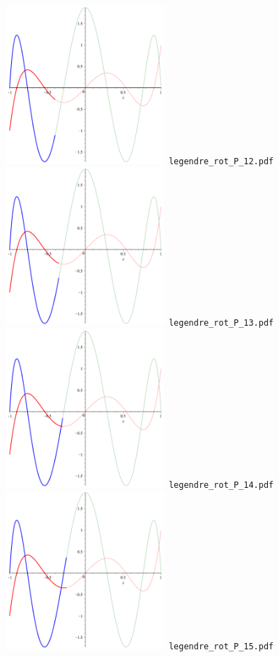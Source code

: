 \documentclass[a4paper]{amsart}
\begin{document}
\includegraphics[width=6cm]{legendre_rot_P_12.pdf}\verb+ legendre_rot_P_12.pdf+\\
\includegraphics[width=6cm]{legendre_rot_P_13.pdf}\verb+ legendre_rot_P_13.pdf+\\
\includegraphics[width=6cm]{legendre_rot_P_14.pdf}\verb+ legendre_rot_P_14.pdf+\\
\includegraphics[width=6cm]{legendre_rot_P_15.pdf}\verb+ legendre_rot_P_15.pdf+\\
\end{document}
